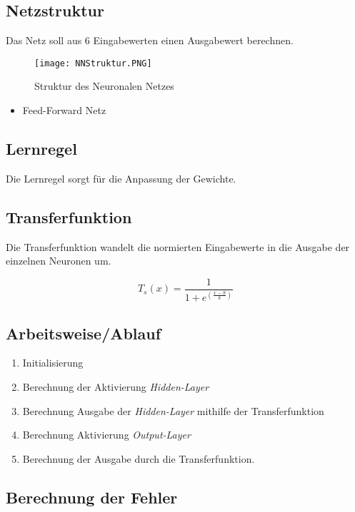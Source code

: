 \subsection{Netzstruktur}
Das Netz soll aus $6$ Eingabewerten einen Ausgabewert berechnen. 

\begin{figure}[h]
	    \centering
        \texttt{[image: NNStruktur.PNG]}
        \label{img:nnStruktur}
        \caption{Struktur des Neuronalen Netzes}
\end{figure}

\begin{itemize}
    \item Feed-Forward Netz
\end{itemize}

\subsection{Lernregel}
Die Lernregel sorgt für die Anpassung der Gewichte. 

\subsection{Transferfunktion}
Die Transferfunktion wandelt die normierten Eingabewerte in die Ausgabe der einzelnen Neuronen um.

\begin{equation}
    T_s(x) = \frac{1}{1+e^(\frac{x-S}{k})}
\end{equation}

\subsection{Arbeitsweise/Ablauf}

\begin{enumerate}
    \item Initialisierung
    \item Berechnung der Aktivierung \textit{Hidden-Layer}
    \item Berechnung Ausgabe der \textit{Hidden-Layer} mithilfe der Transferfunktion
    \item Berechnung Aktivierung \textit{Output-Layer}
    \item Berechnung der Ausgabe durch die Transferfunktion.
\end{enumerate}

\subsection{Berechnung der Fehler}

